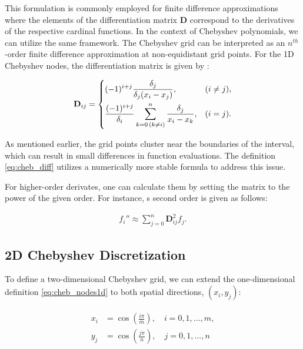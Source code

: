 This formulation is commonly employed for finite difference approximations
where the elements of the differentiation matrix $\mathbf{D}$ correspond to the
derivatives of the respective cardinal functions. In the context of Chebyshev
polynomials, we can utilize the same framework. The Chebyshev grid can be
interpreted as an $n^{th}$-order finite difference approximation at non-equidistant
grid points. For the 1D Chebyshev nodes, the differentiation matrix is given by
\citep{meseguer2020}:

\begin{align}
\mathbf{D}_{ij} =
\begin{dcases}
  (-1)^{i+j} \frac{\delta_j}{\delta_j(x_i - x_j)},
    & (i \neq j), \\
  \frac{(-1)^{i+j}}{\delta_i} \sum^{n}_{k=0 \, (k \neq i)}
    \frac{\delta_j}{x_i - x_k}, & (i = j).
\end{dcases}
\label{eq:cheb_diff}
\end{align}

As mentioned earlier, the grid points cluster near the boundaries of the
interval, which can result in small differences in function evaluations. The
definition \eqref{eq:cheb_diff} utilizes a numerically more stable formula to
address this issue.

For higher-order derivates, one can calculate them by setting the matrix to the
power of the given order. For instance, s second order is given as follows:

\begin{align}
  f_i'' \approx \sum_{j=0}^{n}\mathbf{D}_{ij}^{2}f_j.
\end{align}

\subsection{2D Chebyshev Discretization} \label{sec:2d_cheb}

To define a two-dimensional Chebyshev grid, we can extend the one-dimensional
definition \eqref{eq:cheb_nodes1d} to both spatial directions, $(x_i, y_j)$:

\begin{align} \label{eq:cheb_nodes2d}
  \begin{split}
  x_i & = \cos(\frac{i \pi}{m}), \quad i = 0,1,...,m, \\ 
  y_j &  = \cos(\frac{j \pi}{n}), \quad j = 0,1,...,n
  \end{split}
\end{align}

